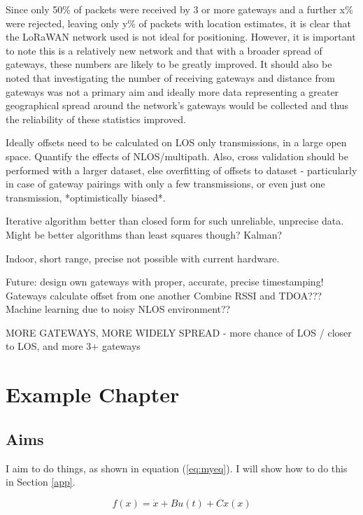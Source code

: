 \documentclass[a4paper]{report}
\begin{document}
  Since only 50\% of packets were received by 3 or more gateways and a further x\% were rejected, leaving only y\% of packets with location estimates, it is clear that the LoRaWAN network used is not ideal for positioning. However, it is important to note this is a relatively new network and that with a broader spread of gateways, these numbers are likely to be greatly improved. It should also be noted that investigating the number of receiving gateways and distance from gateways was not a primary aim and ideally more data representing a greater geographical spread around the network's gateways would be collected and thus the reliability of these statistics improved.

  Ideally offsets need to be calculated on LOS only transmissions, in a large open space. Quantify the effects of NLOS/multipath. Also, cross validation should be performed with a larger dataset, else overfitting of offsets to dataset - particularly in case of gateway pairings with only a few transmissions, or even just one transmission, *optimistically biased*.

  Iterative algorithm better than closed form for such unreliable, unprecise data. Might be better algorithms than least squares though? Kalman?

  Indoor, short range, precise not possible with current hardware.

  Future: design own gateways with proper, accurate, precise timestamping! Gateways calculate offset from one another
  Combine RSSI and TDOA???   Machine learning due to noisy NLOS environment??

  MORE GATEWAYS, MORE WIDELY SPREAD - more chance of LOS / closer to LOS, and more 3+ gateways




\chapter{Example Chapter}

  \section{Aims}
  I aim to do things, as shown in equation (\ref{eq:myeq}). I will show how to do this in Section \ref{app}.

  \begin{equation}
  \label{eq:myeq}
  f(x) = \dot{x} + B u(t) + C x(x)
  \end{equation}
\end{document}
